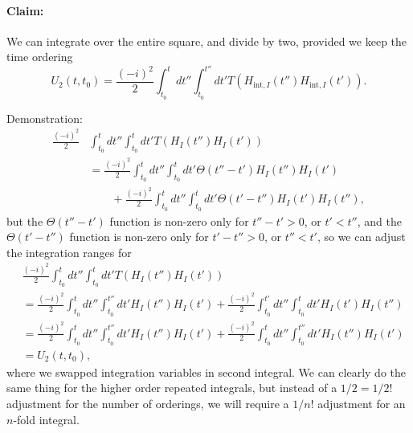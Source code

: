 \paragraph{Claim:} We can integrate over the entire square, and divide by two, provided we keep the time ordering
\begin{dmath}\label{eqn:qftLecture13:1040}
U_2(t, t_0)
= \frac{(-i )^2}{2}
\int_{t_0}^t dt''
\int_{t_0}^{t''}
dt'
T(H_{\text{int}, I}(t'') H_{\text{int}, I}(t') ).
\end{dmath}

Demonstration:
\begin{dmath}\label{eqn:qftLecture13:1100}
\begin{aligned}
\frac{(-i)^2}{2}
&\int_{t_0}^t dt''
\int_{t_0}^t dt'
T( H_I(t'') H_I(t') ) \\
&=
\frac{(-i)^2}{2}
\int_{t_0}^t dt''
\int_{t_0}^t dt'
\Theta(t''- t')
H_I(t'') H_I(t') \\
&\qquad +
\frac{(-i)^2}{2}
\int_{t_0}^t dt''
\int_{t_0}^t dt'
\Theta(t'- t'')
H_I(t') H_I(t''),
\end{aligned}
\end{dmath}
but the \( \Theta(t'' - t') \) function is non-zero only for \( t'' - t' > 0 \), or \( t' < t'' \), and the
\( \Theta(t' - t'') \) function is non-zero only for \( t' - t'' > 0 \), or \( t'' < t' \), so we can adjust the integration ranges for
\begin{dmath}\label{eqn:qftLecture13:1260}
\begin{aligned}
&\frac{(-i)^2}{2}
\int_{t_0}^t dt''
\int_{t_0}^t dt'
T( H_I(t'') H_I(t') ) \\
&=
\frac{(-i)^2}{2}
\int_{t_0}^t dt''
\int_{t_0}^{t''} dt'
H_I(t'') H_I(t')
+
\frac{(-i)^2}{2}
\int_{t_0}^{t'} dt''
\int_{t_0}^t dt'
H_I(t') H_I(t'') \\
&=
\frac{(-i)^2}{2}
\int_{t_0}^t dt''
\int_{t_0}^{t''} dt'
H_I(t'') H_I(t')
+
\frac{(-i)^2}{2}
\int_{t_0}^t dt''
\int_{t_0}^{t''} dt'
H_I(t'') H_I(t') \\
&=
U_2(t, t_0),
\end{aligned}
\end{dmath}
where we swapped integration variables in second integral.  We can clearly do the same thing for the higher order repeated integrals, but instead of a \(1/2 = 1/2!\) adjustment for the number of orderings, we will require a \( 1/n! \) adjustment for an \( n \)-fold integral.

